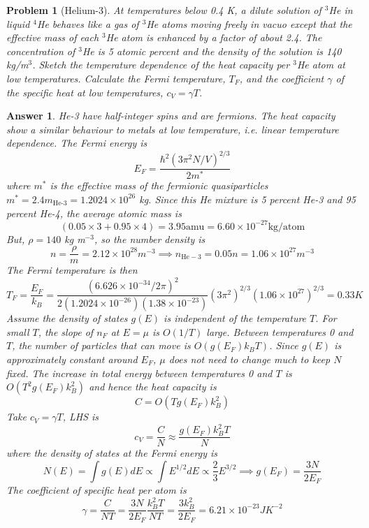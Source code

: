 \documentclass[a4paper]{article}
\newtheorem{ans}{Answer}[section]
\theoremstyle{new}
\newtheorem{qns}{Problem}[section]
\begin{document}
\begin{qns}[Helium-3]
At temperatures below 0.4 K, a dilute solution of $^3$He in liquid $^4$He behaves like a gas of $^3$He atoms moving freely in vacuo except that the effective mass of each $^3$He atom is enhanced by a factor of about 2.4. The concentration of $^3$He is 5 atomic percent and the density of the solution is 140 kg/m$^3$. Sketch the temperature dependence of the heat capacity per $^3$He atom at low temperatures. Calculate the Fermi temperature, $T_F$, and the coefficient $\gamma$ of the specific heat at low temperatures, $c_V = \gamma T$.
\end{qns}
\begin{ans}
He-3 have half-integer spins and are fermions. The heat capacity show a similar behaviour to metals at low temperature, i.e. linear temperature dependence. The Fermi energy is
$$E_F=\frac{\hbar^2(3\pi^2N/V)^{2/3}}{2m^*}$$
where $m^*$ is the effective mass of the fermionic quasiparticles $m^*=2.4m_{\text{He-3}}=1.2024\times10^{26}$ kg. Since this He mixture is 5 percent He-3 and 95 percent He-4, the average atomic mass is 
$$(0.05\times 3+0.95\times 4)=3.95\text{amu}=6.60\times10^{-27}\text{kg/atom}$$
But, $\rho=140$ kg m$^{-3}$, so the number density is 
$$n=\frac{\rho}{m}=2.12\times10^{28}m^{-3}\implies n_{\text{He}-3}=0.05 n=1.06\times10^{27}m^{-3}$$
The Fermi temperature is then
$$T_F=\frac{E_F}{k_B}=\frac{(6.626\times10^{-34}/2\pi)^2}{2(1.2024\times10^{-26})(1.38\times10^{-23})}(3\pi^2)^{2/3}(1.06\times10^{27})^{2/3}=0.33K$$
Assume the density of states $g(E)$ is independent of the temperature $T$. For small $T$, the slope of $n_F$ at $E=\mu$ is $O(1/T)$ large. Between temperatures 0 and $T$, the number of particles that can move is $O(g(E_F)k_BT)$. Since $g(E)$ is approximately constant around $E_F$, $\mu$ does not need to change much to keep $N$ fixed. The increase in total energy between temperatures 0 and $T$ is $O(T^2g(E_F)k_B^2)$ and hence the heat capacity is
$$C=O(Tg(E_F)k_B^2)$$
Take $c_V=\gamma T$, LHS is
$$c_V=\frac{C}{N}\approx\frac{g(E_F)k_B^2T}{N}$$
where the density of states at the Fermi energy is
$$N(E)=\int g(E)dE\propto\int E^{1/2}dE\propto\frac{2}{3}E^{3/2}\implies g(E_F)=\frac{3N}{2E_F}$$
The coefficient of specific heat per atom is
$$\gamma=\frac{C}{NT}=\frac{3N}{2E_F}\frac{k_B^2T}{NT}=\frac{3k_B^2}{2E_F}=6.21\times10^{-23}JK^{-2}$$
\end{ans}
\end{document}
